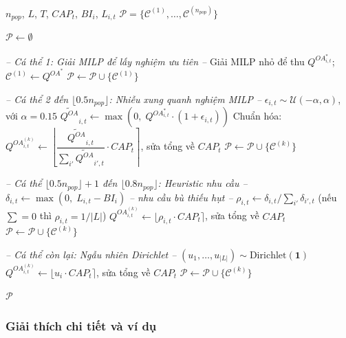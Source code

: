 \documentclass[12pt]{article}
\newcommand{\QOA}{Q^{OA}}
\begin{document}
\begin{algorithm}[H]
\caption{Khởi tạo quần thể đa dạng}
\label{alg:init}
\begin{algorithmic}[1]
\Require $n_{pop}$, $L$, $T$, $CAP_t$, $BI_i$, $L_{i,t}$
\Ensure $\mathcal{P} = \{\mathcal{C}^{(1)}, \ldots, \mathcal{C}^{(n_{pop})}\}$

\State $\mathcal{P} \gets \emptyset$

\State \textit{-- Cá thể 1: Giải MILP để lấy nghiệm ưu tiên --}
\State Giải MILP nhỏ để thu $\QOA^*_{i,t}$; \; $\mathcal{C}^{(1)} \gets \QOA^*$
\State $\mathcal{P} \gets \mathcal{P} \cup \{\mathcal{C}^{(1)}\}$

\State \textit{-- Cá thể 2 đến $\lfloor 0.5 n_{pop} \rfloor$: Nhiễu xung quanh nghiệm MILP --}
    \State $\epsilon_{i,t} \sim \mathcal{U}(-\alpha, \alpha)$, với $\alpha = 0.15$
    \State $\widetilde{\QOA}_{i,t} \gets \max\!\left(0,\; \QOA^*_{i,t} \cdot (1 + \epsilon_{i,t})\right)$
  \EndFor
  \State Chuẩn hóa: $\QOA^{(k)}_{i,t} \gets \left\lfloor \dfrac{\widetilde{\QOA}_{i,t}}{\sum_{i'}\widetilde{\QOA}_{i',t}} \cdot CAP_t \right\rceil$, sửa tổng về $CAP_t$
  \State $\mathcal{P} \gets \mathcal{P} \cup \{\mathcal{C}^{(k)}\}$
\EndFor

\State \textit{-- Cá thể $\lfloor 0.5 n_{pop} \rfloor + 1$ đến $\lfloor 0.8 n_{pop} \rfloor$: Heuristic nhu cầu --}
    \State $\delta_{i,t} \gets \max(0,\; L_{i,t} - BI_i)$ \quad \textit{-- nhu cầu bù thiếu hụt --}
    \State $\rho_{i,t} \gets \delta_{i,t} / \sum_{i'} \delta_{i',t}$ \quad (nếu $\sum = 0$ thì $\rho_{i,t} = 1/|L|$)
    \State $\QOA^{(k)}_{i,t} \gets \lfloor \rho_{i,t} \cdot CAP_t \rceil$, sửa tổng về $CAP_t$
  \EndFor
  \State $\mathcal{P} \gets \mathcal{P} \cup \{\mathcal{C}^{(k)}\}$
\EndFor

\State \textit{-- Cá thể còn lại: Ngẫu nhiên Dirichlet --}
    \State $(u_1,\ldots,u_{|L|}) \sim \mathrm{Dirichlet}(\mathbf{1})$
    \State $\QOA^{(k)}_{i,t} \gets \lfloor u_i \cdot CAP_t \rceil$, sửa tổng về $CAP_t$
  \EndFor
  \State $\mathcal{P} \gets \mathcal{P} \cup \{\mathcal{C}^{(k)}\}$
\EndFor

\State \Return $\mathcal{P}$
\end{algorithmic}
\end{algorithm}

\subsubsection*{Giải thích chi tiết và ví dụ}
\end{document}
